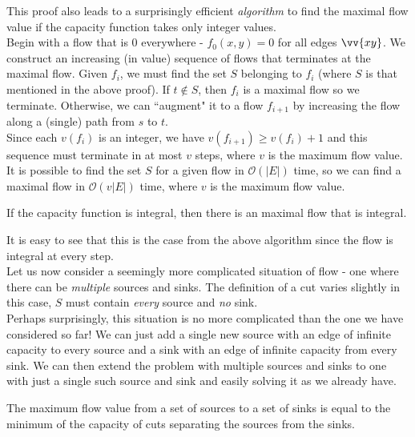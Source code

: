 This proof also leads to a surprisingly efficient \textit{algorithm} to find the maximal flow value if the capacity function takes only integer values.\\

Begin with a flow that is $0$ everywhere - $f_0(x,y)=0$ for all edges $\vv{xy}$. We construct an increasing (in value) sequence of flows that terminates at the maximal flow. Given $f_i$, we must find the set $S$ belonging to $f_i$ (where $S$ is that mentioned in the above proof). If $t\not\in S$, then $f_i$ is a maximal flow so we terminate. Otherwise, we can ``augment" it to a flow $f_{i+1}$ by increasing the flow along a (single) path from $s$ to $t$. \\
Since each $v(f_i)$ is an integer, we have $v(f_{i+1})\geq v(f_i)+1$ and this sequence must terminate in at most $v$ steps, where $v$ is the maximum flow value. \\

It is possible to find the set $S$ for a given flow in $\mathcal{O}(|E|)$ time, so we can find a maximal flow in $\mathcal{O}(v|E|)$ time, where $v$ is the maximum flow value.

\begin{corollary}
\label{integrality theorem}
If the capacity function is integral, then there is an maximal flow that is integral.
\end{corollary}

It is easy to see that this is the case from the above algorithm since the flow is integral at every step. \\

Let us now consider a seemingly more complicated situation of flow - one where there can be \textit{multiple} sources and sinks. The definition of a cut varies slightly in this case, $S$ must contain \textit{every} source and \textit{no} sink.\\
Perhaps surprisingly, this situation is no more complicated than the one we have considered so far! We can just add a single new source with an edge of infinite capacity to every source and a sink with an edge of infinite capacity from every sink. We can then extend the problem with multiple sources and sinks to one with just a single such source and sink and easily solving it as we already have.

\begin{theorem}
\label{maxFlow minCut multiple source sink}
The maximum flow value from a set of sources to a set of sinks is equal to the minimum of the capacity of cuts separating the sources from the sinks.
\end{theorem}

